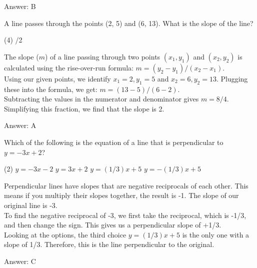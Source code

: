 \documentclass[11pt,paper=a4,answers]{exam}
\begin{document}
\begin{questions}
\begin{solution}
\vspace{15pt}
Answer: \colorbox{yellow!100}{B}
\end{solution}

\question
A line passes through the points (2, 5) and (6, 13). What is the slope of the line?
\begin{tasks}(4)
    /2
\end{tasks}

\begin{solution}
The slope ($m$) of a line passing through two points $(x_1, y_1)$ and $(x_2, y_2)$ is calculated using the rise-over-run formula: $m = (y_2 - y_1) / (x_2 - x_1)$.
\\[10pt]
Using our given points, we identify $x_1 = 2, y_1 = 5$ and $x_2 = 6, y_2 = 13$. Plugging these into the formula, we get: $m = (13 - 5) / (6 - 2)$.
\\[10pt]
Subtracting the values in the numerator and denominator gives $m = 8 / 4$. Simplifying this fraction, we find that the slope is 2.

\vspace{15pt}
Answer: \colorbox{yellow!100}{A}
\end{solution}

\question
Which of the following is the equation of a line that is perpendicular to $y = -3x + 2$?
\begin{tasks}(2)
    \task $y = -3x - 2$
    \task $y = 3x + 2$
    \task $y = (1/3)x + 5$
    \task $y = -(1/3)x + 5$
\end{tasks}

\begin{solution}
Perpendicular lines have slopes that are negative reciprocals of each other. This means if you multiply their slopes together, the result is -1. The slope of our original line is -3.
\\[10pt]
To find the negative reciprocal of -3, we first take the reciprocal, which is -1/3, and then change the sign. This gives us a perpendicular slope of +1/3.
\\[10pt]
Looking at the options, the third choice $y = (1/3)x + 5$ is the only one with a slope of 1/3. Therefore, this is the line perpendicular to the original.

\vspace{15pt}
Answer: \colorbox{yellow!100}{C}
\end{solution}


\end{questions}
\end{document}
